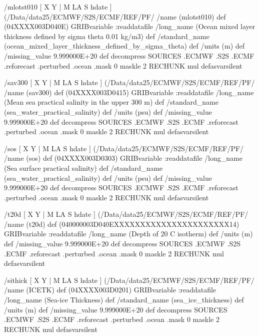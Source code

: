 \begin{ingrid}
/mlotst010 { [ X Y | M LA S hdate ] (/Data/data25/ECMWF/S2S/ECMF/REF/PF/%
/name (mlotst010) def
(04XXXX003D040E) GRIBvariable 
:readdatafile
/long_name (Ocean mixed layer thickness defined by sigma theta 0.01 kg/m3) def
/standard_name (ocean_mixed_layer_thickness_defined_by_sigma_theta) def
/units (m) def
/missing_value 9.999000E+20 def
decompress
  SOURCES .ECMWF .S2S .ECMF .reforecast .perturbed .ocean .mask
  0 maskle
  2 RECHUNK
  mul
} defasvarsilent

/sav300 { [ X Y | M LA S hdate ] (/Data/data25/ECMWF/S2S/ECMF/REF/PF/%
/name (sav300) def
(04XXXX003D0415) GRIBvariable
:readdatafile
/long_name (Mean sea practical salinity in the upper 300 m) def
/standard_name (sea_water_practical_salinity) def
/units (psu) def
/missing_value 9.999000E+20 def
decompress
  SOURCES .ECMWF .S2S .ECMF .reforecast .perturbed .ocean .mask
  0 maskle
  2 RECHUNK
  mul
} defasvarsilent

/sos { [ X Y | M LA S hdate ] (/Data/data25/ECMWF/S2S/ECMF/REF/PF/%
/name (sos) def
(04XXXX003D0303) GRIBvariable
:readdatafile
/long_name (Sea surface practical salinity) def
/standard_name (sea_water_practical_salinity) def
/units (psu) def
/missing_value 9.999000E+20 def
decompress
  SOURCES .ECMWF .S2S .ECMF .reforecast .perturbed .ocean .mask
  0 maskle
  2 RECHUNK
  mul
} defasvarsilent

/t20d { [ X Y | M LA S hdate ] (/Data/data25/ECMWF/S2S/ECMF/REF/PF/%
/name (t20d) def
 (040000003D040EXXXXXXXXXXXXXXXXXXXXXX14) GRIBvariable
:readdatafile
/long_name (Depth of 20 C isotherm) def
/units (m) def
/missing_value 9.999000E+20 def
decompress
  SOURCES .ECMWF .S2S .ECMF .reforecast .perturbed .ocean .mask
  0 maskle
  2 RECHUNK
  mul
} defasvarsilent

/sithick { [ X Y | M LA S hdate ] (/Data/data25/ECMWF/S2S/ECMF/REF/PF/%
/name (ICETK) def
(04XXXX003D0201) GRIBvariable
:readdatafile
/long_name (Sea-ice Thickness) def
/standard_name (sea_ice_thickness) def
/units (m) def
/missing_value 9.999000E+20 def
decompress
  SOURCES .ECMWF .S2S .ECMF .reforecast .perturbed .ocean .mask
  0 maskle
  2 RECHUNK
  mul
} defasvarsilent


\end{ingrid}
